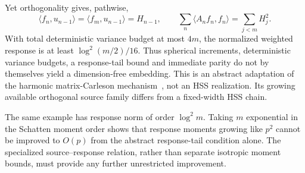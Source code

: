 \documentclass[11pt,oneside,openany,a4paper]{book}
\numberwithin{equation}{chapter}
\theoremstyle{definition}
\theoremstyle{remark}
\newcommand{\proofstep}[1]{\par\addvspace{.45\baselineskip}\Needspace{3\baselineskip}\textbf{#1}\par\nobreak}
\newcommand{\R}{\mathbb R}\newcommand{\E}{\mathbb E}\newcommand{\Prb}{\mathbb P}\newcommand{\PP}{\mathbb P}
\newcommand{\T}{\mathsf T}\newcommand{\Id}{I}
\newcommand{\F}[1]{\left\lVert#1\right\rVert_F}
\newcommand{\N}[1]{\left\lVert#1\right\rVert}
\newcommand{\op}[1]{\left\lVert#1\right\rVert_{\rm op}}
\newcommand{\ip}[2]{\left\langle#1,#2\right\rangle_F}
\DeclareMathOperator{\tr}{tr}\DeclareMathOperator{\rank}{rank}
\DeclareMathOperator{\diag}{blockdiag}\DeclareMathOperator{\range}{range}
\DeclareMathOperator{\HSS}{HSS}\DeclareMathOperator{\dist}{dist}
\DeclareMathOperator{\Var}{Var}\DeclareMathOperator{\supp}{supp}
\newcommand{\UC}{\mathcal U}\newcommand{\VC}{\mathcal V}\newcommand{\err}{\mathcal E}
\newcommand{\Sn}[2]{\left\lVert#1\right\rVert_{S_{#2}}}
\newcommand{\Cov}{\mathsf C}\newcommand{\Loss}{\mathsf L}\newcommand{\Fil}{\mathcal F}
\DeclareMathOperator{\diver}{div}\DeclareMathOperator{\vecop}{vec}\DeclareMathOperator{\Gammafun}{Gamma}
\begin{document}
Yet orthogonality gives, pathwise,
\[
 \langle f_n,u_{n-1}\rangle=\langle f_m,u_{n-1}\rangle=H_{n-1},
 \qquad \sum_n\langle A_nf_n,f_n\rangle=\sum_{j<m}H_j^2.
\]
With total deterministic variance budget at most $4m$, the normalized weighted response is at least $\log^2(m/2)/16$. Thus spherical increments, deterministic variance budgets, a response-tail bound and immediate parity do not by themselves yield a dimension-free embedding. This is an abstract adaptation of the harmonic matrix-Carleson mechanism~\cite{NTV,NPTV}, not an HSS realization. Its growing available orthogonal source family differs from a fixed-width HSS chain.

The same example has response norm of order $\log^2m$. Taking $m$ exponential in the Schatten moment order shows that response moments growing like $p^2$ cannot be improved to $O(p)$ from the abstract response-tail condition alone. The specialized source--response relation, rather than separate isotropic moment bounds, must provide any further unrestricted improvement.



\endgroup

\begingroup
\let\R\relax
\newcommand{\R}{\mathbb R}
\let\E\relax
\newcommand{\E}{\mathbb E}
\let\Prb\relax
\newcommand{\Prb}{\mathbb P}
\let\T\relax
\newcommand{\T}{\mathsf T}
\let\F\relax
\newcommand{\F}[1]{\left\lVert#1\right\rVert_{F}}
\let\N\relax
\newcommand{\N}[1]{\left\lVert#1\right\rVert}
\let\ip\relax
\newcommand{\ip}[2]{\left\langle#1,#2\right\rangle_F}
\let\tr\relax
\newcommand{\tr}{\operatorname{tr}}
\let\rank\relax
\newcommand{\rank}{\operatorname{rank}}
\let\diag\relax
\newcommand{\diag}{\operatorname{blockdiag}}
\let\range\relax
\newcommand{\range}{\operatorname{range}}
\let\OPT\relax
\newcommand{\OPT}{\operatorname{OPT}}
\let\HSS\relax
\newcommand{\HSS}{\operatorname{HSS}}
\let\diver\relax
\newcommand{\diver}{\operatorname{div}}
\let\Var\relax
\newcommand{\Var}{\operatorname{Var}}
\let\UC\relax
\newcommand{\UC}{\mathcal U}
\let\VC\relax
\newcommand{\VC}{\mathcal V}
\let\err\relax
\newcommand{\err}{\mathcal E}
\let\proofstep\relax
\newcommand{\proofstep}[1]{\par\addvspace{.45\baselineskip}\Needspace{3\baselineskip}\textbf{#1}\par\nobreak}
\let\op\relax
\newcommand{\op}[1]{\left\lVert#1\right\rVert_{\mathrm{op}}}
\let\Sn\relax
\newcommand{\Sn}[2]{\left\lVert#1\right\rVert_{S_{#2}}}
\let\Cov\relax
\newcommand{\Cov}{\mathsf C}
\let\Loss\relax
\newcommand{\Loss}{\mathsf L}
\let\Fil\relax
\newcommand{\Fil}{\mathcal F}
\let\Id\relax
\newcommand{\Id}{I}
\let\supp\relax
\newcommand{\supp}{\operatorname{supp}}
\let\vecop\relax
\newcommand{\vecop}{\operatorname{vec}}
\let\Gammafun\relax
\newcommand{\Gammafun}{\operatorname{Gamma}}
\end{document}
